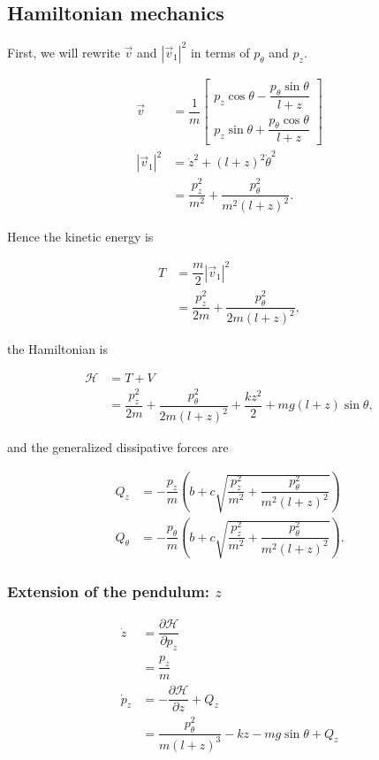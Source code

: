 \documentclass[12pt,a4paper,portrait]{article}
\newcommand{\ham}{\mathcal{H}}
\begin{document}
\subsection{Hamiltonian mechanics}
First, we will rewrite $\vec{v}$ and $|\vec{v}_1|^2$ in terms of $p_{\theta}$ and $p_z$. 

\begin{align*}
	\vec{v} &= \dfrac{1}{m}\begin{bmatrix}
		p_z\cos{\theta} - \dfrac{p_{\theta}\sin{\theta}}{l+z}\\
		p_z\sin{\theta} + \dfrac{p_{\theta}\cos{\theta}}{l+z}
	\end{bmatrix} \\
	|\vec{v}_1|^2 &= \dot{z}^2 + (l+z)^2 \dot{\theta}^2 \\
	&= \dfrac{p_z^2}{m^2} + \dfrac{p_{\theta}^2}{m^2(l+z)^2}.
\end{align*}

Hence the kinetic energy is

\begin{align*}
	T &= \dfrac{m}{2} |\vec{v}_1|^2 \\
	&= \dfrac{p_z^2}{2m} + \dfrac{p_{\theta}^2}{2m(l+z)^2},
\end{align*}

the Hamiltonian is

\begin{align*}
	\ham &= T + V\\
	&= \dfrac{p_z^2}{2m} + \dfrac{p_{\theta}^2}{2m(l+z)^2} + \dfrac{kz^2}{2} + mg(l+z)\sin{\theta},
\end{align*}

and the generalized dissipative forces are

\begin{align*}
	Q_z &= -\dfrac{p_z}{m}\left(b+c\sqrt{\dfrac{p_z^2}{m^2} + \dfrac{p_{\theta}^2}{m^2(l+z)^2}}\right) \\
	Q_{\theta} &= -\dfrac{p_{\theta}}{m} \left(b+c\sqrt{\dfrac{p_z^2}{m^2} + \dfrac{p_{\theta}^2}{m^2(l+z)^2}}\right).
\end{align*}

\subsubsection{Extension of the pendulum: $z$}
\begin{align*}
	\dot{z} &= \dfrac{\partial \ham}{\partial p_z} \\
	&= \dfrac{p_z}{m} \\
	\dot{p}_z &= -\dfrac{\partial \ham}{\partial z} + Q_z\\
	&= \dfrac{p_{\theta}^2}{m(l+z)^3} - kz - mg\sin{\theta} + Q_z
\end{align*}
\end{document}
